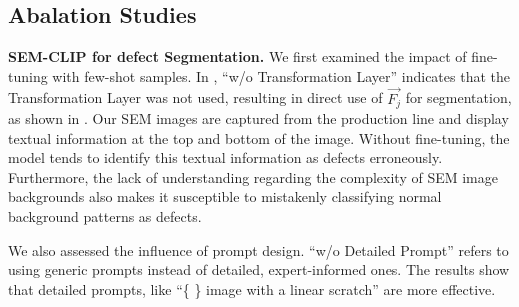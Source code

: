 


\subsection{Abalation Studies}

\noindent
\textbf{SEM-CLIP for defect Segmentation.}
We first examined the impact of fine-tuning with few-shot samples. In , ``w/o Transformation Layer'' indicates that the Transformation Layer was not used, resulting in direct use of \( \vec{F_{j}} \) for segmentation, as shown in . 
Our SEM images are captured from the production line and display textual information at the top and bottom of the image. Without fine-tuning, the model tends to identify this textual information as defects erroneously. Furthermore, the lack of understanding regarding the complexity of SEM image backgrounds also makes it susceptible to mistakenly classifying normal background patterns as defects.


We also assessed the influence of prompt design. ``w/o Detailed Prompt'' refers to using generic prompts instead of detailed, expert-informed ones. The results show that detailed prompts, like ``\{ \} image with a linear scratch'' are more effective.

